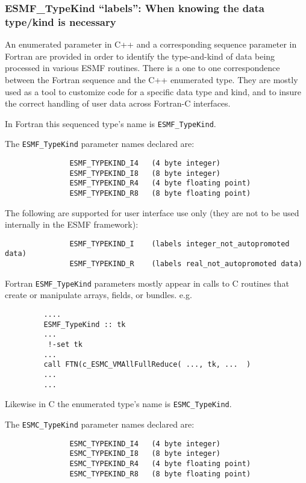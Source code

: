 \subsubsection{ESMF\_TypeKind ``labels'': When knowing the data type/kind is necessary}

An enumerated parameter in C++ and a corresponding sequence parameter in Fortran are provided in order to identify the type-and-kind of data being processed in various ESMF routines. There is a one to one correspondence between the Fortran sequence and the C++ enumerated type. They are mostly used as a tool to customize code for a specific data type and kind, and to insure the correct handling of user data across Fortran-C interfaces.

In Fortran this sequenced type's name is {\tt ESMF\_TypeKind}.

The {\tt ESMF\_TypeKind} parameter names declared are:

\begin{verbatim}
               ESMF_TYPEKIND_I4   (4 byte integer)
               ESMF_TYPEKIND_I8   (8 byte integer)
               ESMF_TYPEKIND_R4   (4 byte floating point)
               ESMF_TYPEKIND_R8   (8 byte floating point)
\end{verbatim}

The following are supported for user interface use only (they are not to be used internally in the ESMF framework):
\begin{verbatim}
               ESMF_TYPEKIND_I    (labels integer_not_autopromoted data)
               ESMF_TYPEKIND_R    (labels real_not_autopromoted data)
\end{verbatim}

Fortran {\tt ESMF\_TypeKind} parameters mostly appear in calls to C routines that create or manipulate arrays, fields, or bundles. e.g.
\begin{verbatim}
         ....
         ESMF_TypeKind :: tk
         ...
          !-set tk
         ...
         call FTN(c_ESMC_VMAllFullReduce( ..., tk, ...  )
         ...
         ...
\end{verbatim}
Likewise in C the enumerated type's name is {\tt ESMC\_TypeKind}.

The {\tt ESMC\_TypeKind} parameter names declared are:
\begin{verbatim}
               ESMC_TYPEKIND_I4   (4 byte integer)
               ESMC_TYPEKIND_I8   (8 byte integer)
               ESMC_TYPEKIND_R4   (4 byte floating point)
               ESMC_TYPEKIND_R8   (8 byte floating point)
\end{verbatim}

